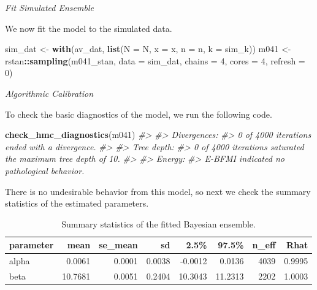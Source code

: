 \documentclass[11pt, oneside, openany]{scrbook}
\newenvironment{Shaded}{\begin{snugshade}}{\end{snugshade}}
\newcommand{\CommentTok}[1]{\textcolor[rgb]{0.56,0.35,0.01}{\textit{#1}}}
\newcommand{\DataTypeTok}[1]{\textcolor[rgb]{0.13,0.29,0.53}{#1}}
\newcommand{\DecValTok}[1]{\textcolor[rgb]{0.00,0.00,0.81}{#1}}
\newcommand{\KeywordTok}[1]{\textcolor[rgb]{0.13,0.29,0.53}{\textbf{#1}}}
\newcommand{\NormalTok}[1]{#1}
\newcommand{\OperatorTok}[1]{\textcolor[rgb]{0.81,0.36,0.00}{\textbf{#1}}}
\newcommand{\StringTok}[1]{\textcolor[rgb]{0.31,0.60,0.02}{#1}}
\begin{document}
\emph{Fit Simulated Ensemble}

We now fit the model to the simulated data.


\begin{Shaded}
\begin{Highlighting}[]
\NormalTok{sim_dat <-}\StringTok{ }\KeywordTok{with}\NormalTok{(av_dat, }\KeywordTok{list}\NormalTok{(}\DataTypeTok{N =}\NormalTok{ N, }\DataTypeTok{x =}\NormalTok{ x, }\DataTypeTok{n =}\NormalTok{ n, }\DataTypeTok{k =}\NormalTok{ sim_k)) }
\NormalTok{m041 <-}\StringTok{ }\NormalTok{rstan}\OperatorTok{::}\KeywordTok{sampling}\NormalTok{(m041_stan, }\DataTypeTok{data =}\NormalTok{ sim_dat, }
                        \DataTypeTok{chains =} \DecValTok{4}\NormalTok{, }\DataTypeTok{cores =} \DecValTok{4}\NormalTok{, }\DataTypeTok{refresh =} \DecValTok{0}\NormalTok{)}
\end{Highlighting}
\end{Shaded}


\emph{Algorithmic Calibration}

To check the basic diagnostics of the model, we run the following code.


\begin{Shaded}
\begin{Highlighting}[]
\KeywordTok{check_hmc_diagnostics}\NormalTok{(m041)}
\CommentTok{#> }
\CommentTok{#> Divergences:}
\CommentTok{#> 0 of 4000 iterations ended with a divergence.}
\CommentTok{#> }
\CommentTok{#> Tree depth:}
\CommentTok{#> 0 of 4000 iterations saturated the maximum tree depth of 10.}
\CommentTok{#> }
\CommentTok{#> Energy:}
\CommentTok{#> E-BFMI indicated no pathological behavior.}
\end{Highlighting}
\end{Shaded}


There is no undesirable behavior from this model, so next we check the summary statistics of the estimated parameters.

\begin{table}[!h]

\caption{\label{tab:ch041-Cloudy-Toupee}Summary statistics of the fitted Bayesian ensemble.}
\centering
\begin{tabular}[t]{lrrrrrrr}
\toprule
parameter & mean & se\_mean & sd & 2.5\% & 97.5\% & n\_eff & Rhat\\
\midrule
alpha & 0.0061 & 0.0001 & 0.0038 & -0.0012 & 0.0136 & 4039 & 0.9995\\
beta & 10.7681 & 0.0051 & 0.2404 & 10.3043 & 11.2313 & 2202 & 1.0003\\
\bottomrule
\end{tabular}
\end{table}
\end{document}
